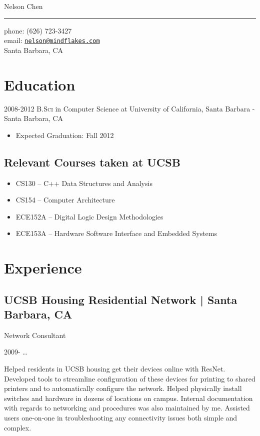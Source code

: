 \documentclass[10pt, letter]{article}
\makeatletter
\def\myname{Nelson Chen}
\def\myemail{nelson@mindflakes.com}
\def\mycellphone{(626) 723-3427}
\def\myaddress{Santa Barbara, CA}
\newcommand{\years}[1]{\marginnote{#1}}
\renewcommand{\years}[1]{#1}
\makeatother
\begin{document}
{\LARGE \myname}\\
\hrule
\begin{multicols}{2}
\vspace{0.2in}
{\large phone: \mycellphone}\\[.05cm]
{\large email: \href{mailto:\myemail}{\texttt{\myemail}}}\\[.05cm]
\myaddress


\section*{Education}

\years{2008-2012} \textsc{B.Sci} in Computer Science at University of California, Santa Barbara - Santa Barbara, CA

\begin{itemize}
    \item Expected Graduation: Fall 2012
\end{itemize}

\subsection*{Relevant Courses taken at UCSB}

\begin{itemize}
    \item CS130 -- C++ Data Structures and Analysis
    \item CS154 -- Computer Architecture
    \item ECE152A -- Digital Logic Design Methodologies
    \item ECE153A -- Hardware Software Interface and Embedded Systems
\end{itemize}

\section*{Experience}

\subsection*{UCSB Housing Residential Network | {\footnotesize{Santa Barbara, CA}}}

Network Consultant

\years{2009- \ldots} 

Helped residents in UCSB housing get their devices online with ResNet.
Developed tools to streamline configuration of these devices for printing to
shared printers and to automatically configure the network. Helped physically
install switches and hardware in dozens of locations on campus. Internal
documentation with regards to networking and procedures was also maintained by
me. Assisted users one-on-one in troubleshooting any connectivity issues both
simple and complex.


\end{multicols}
\end{document}
